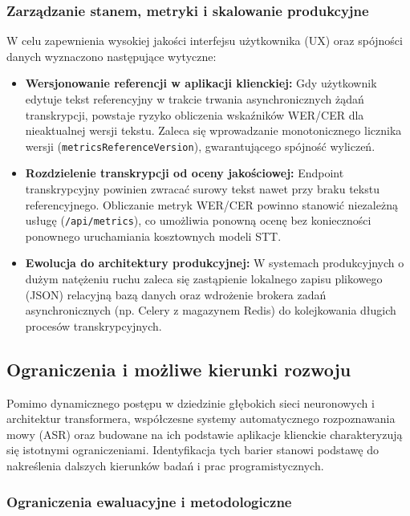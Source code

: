 \subsubsection{Zarządzanie stanem, metryki i skalowanie produkcyjne}

W celu zapewnienia wysokiej jakości interfejsu użytkownika (UX) oraz spójności danych wyznaczono następujące wytyczne:

\begin{itemize}
    \item \textbf{Wersjonowanie referencji w aplikacji klienckiej:} Gdy użytkownik edytuje tekst referencyjny w trakcie trwania asynchronicznych żądań transkrypcji, powstaje ryzyko obliczenia wskaźników WER/CER dla nieaktualnej wersji tekstu. Zaleca się wprowadzanie monotonicznego licznika wersji (\texttt{metricsReferenceVersion}), gwarantującego spójność wyliczeń.
    \item \textbf{Rozdzielenie transkrypcji od oceny jakościowej:} Endpoint transkrypcyjny powinien zwracać surowy tekst nawet przy braku tekstu referencyjnego. Obliczanie metryk WER/CER powinno stanowić niezależną usługę (\texttt{/api/metrics}), co umożliwia ponowną ocenę bez konieczności ponownego uruchamiania kosztownych modeli STT.
    \item \textbf{Ewolucja do architektury produkcyjnej:} W systemach produkcyjnych o dużym natężeniu ruchu zaleca się zastąpienie lokalnego zapisu plikowego (JSON) relacyjną bazą danych oraz wdrożenie brokera zadań asynchronicznych (np. Celery z magazynem Redis) do kolejkowania długich procesów transkrypcyjnych.
\end{itemize}

\subsection{Ograniczenia i możliwe kierunki rozwoju}
\label{subsec:limitations_future}

Pomimo dynamicznego postępu w dziedzinie głębokich sieci neuronowych i architektur transformera, współczesne systemy automatycznego rozpoznawania mowy (ASR) oraz budowane na ich podstawie aplikacje klienckie charakteryzują się istotnymi ograniczeniami. Identyfikacja tych barier stanowi podstawę do nakreślenia dalszych kierunków badań i prac programistycznych.

\subsubsection{Ograniczenia ewaluacyjne i metodologiczne}

